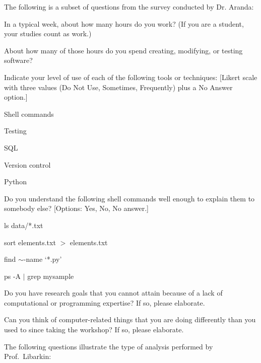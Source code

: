 \documentclass{proposalnsf}
\begin{document}
The following is a subset of questions from the survey conducted by 
Dr. Aranda: 

\begin{compactitem}
\item In a typical week, about how many hours do you work? 
(If you are a student, your studies count as work.)

\item About how many of those hours do you spend creating, modifying, or testing software?

\item Indicate your level of use of each of the following tools or techniques: [Likert scale with three values (Do Not Use, Sometimes, Frequently) plus a No Answer option.]
  \begin{compactitem}
  \item Shell commands
  \item Testing
  \item SQL
  \item Version control
  \item Python
  \end{compactitem}
  
\item Do you understand the following shell commands well enough to explain them to somebody else? [Options: Yes, No, No answer.]
  \begin{compactitem}
  \item ls data/*.txt
  \item sort elements.txt $>$ elements.txt
  \item find $\sim$-name `*.py'
  \item ps -A $|$ grep mysample
  \end{compactitem}

\item Do you have research goals that you cannot attain because of a lack of computational or programming expertise? If so, please elaborate.

\item Can you think of computer-related things that you are doing differently than you used to since taking the workshop? If so, please elaborate.
\end{compactitem}

The following questions illustrate the type of analysis performed by
Prof.\ Libarkin: 
\end{document}
